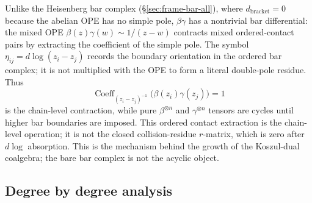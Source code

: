 \medskip
Unlike the Heisenberg bar complex (\S\ref{sec:frame-bar-all}), where
$d_{\mathrm{bracket}} = 0$ because the abelian OPE has no simple pole,
$\beta\gamma$ has a nontrivial bar differential: the mixed OPE
$\beta(z)\gamma(w) \sim 1/(z-w)$ contracts mixed ordered-contact
pairs by extracting the coefficient of the simple pole. The symbol
$\eta_{ij}=d\log(z_i-z_j)$ records the boundary orientation in the
ordered bar complex; it is not multiplied with the OPE to form a
literal double-pole residue. Thus
\[
 \operatorname{Coeff}_{(z_i-z_j)^{-1}}
 \bigl(\beta(z_i)\gamma(z_j)\bigr)=1
\]
is the chain-level contraction,
while pure $\beta^{\otimes n}$ and $\gamma^{\otimes n}$ tensors are
cycles until higher bar boundaries are imposed. This ordered contact
extraction is the chain-level operation; it is not the closed
collision-residue $r$-matrix, which is zero after $d\log$
absorption. This is the mechanism behind the growth of the
Koszul-dual coalgebra; the bare bar complex is not the acyclic object.

\subsection{Degree by degree analysis}

